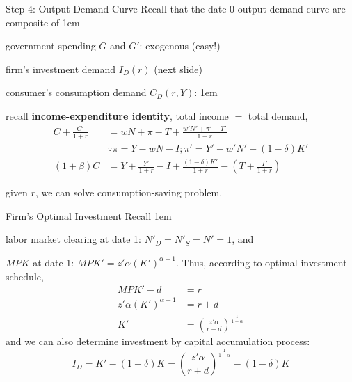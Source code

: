 \documentclass[11pt,aspectratio=43]{beamer}
\let\olditemize=\itemize
\let\endolditemize=\enditemize
\renewenvironment{itemize}{\olditemize \itemsep1em}{\endolditemize}
\theoremstyle{definition}
\begin{document}
\begin{frame}{Step 4: Output Demand Curve}
\label{slide:Step_4__Output_Demand_Curve}
    Recall that the date 0 output demand curve are composite of
    \begin{itemize}
        \item government spending $ G $ and $ G' $: exogenous (easy!)
        \item firm's investment demand $ I_{D}( r ) $ (next slide)
        \item consumer's consumption demand $ C_{D}( r, Y ) $:
        \begin{itemize}
            \item recall \textbf{income-expenditure identity}, total income $ = $ total demand,
            \begin{align*}
                C + \frac{C'}{1+r}
                    &  = wN + \pi - T + \frac{w' N' + \pi' - T'}{1+r}
                \\
                    & \because \pi = Y - wN - I; \pi' = Y' - w'N' + ( 1-\delta )K'
                \\
                ( 1+\beta ) C
                    & = Y + \frac{Y'}{1+r} - I + \frac{( 1-\delta )K'}{1+r} - \left( T + \frac{T'}{1+r} \right)
            \end{align*}
            \item given $ r $, we can solve consumption-saving problem.
        \end{itemize}
    \end{itemize}
\end{frame}

\begin{frame}{Firm's Optimal Investment}
\label{slide:Firm_s_Optimal_Investment}
    Recall
    \begin{itemize}
        \item labor market clearing at date 1: $ N'_{D} = N'_{S} = N' = 1 $, and
        \item $ MPK $ at date 1: $ MPK' = z' \alpha ( K' )^{\alpha-1}$.
    \end{itemize}
    Thus, according to optimal investment schedule,
    \begin{align*}
        MPK' - d
            &= r
        \\
        z' \alpha ( K' )^{\alpha-1}
            &=  r + d
        \\
        K'
            &= \left(
                \frac{z' \alpha}{r+d}
            \right)^{\frac{1}{1-\alpha}}
    \end{align*}
    and we can also determine investment by capital accumulation process:
    \begin{equation*}
        I_{D} = K' - ( 1-\delta)K
          = \left(
                \frac{z' \alpha}{r+d}
            \right)^{\frac{1}{1-\alpha}}
            - ( 1-\delta )K
    \end{equation*}
\end{frame}
\end{document}
